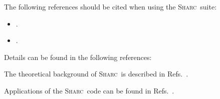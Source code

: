 \documentclass[a4paper,10pt,DIV=15,openany]{scrbook}
\newcommand{\sharc}{\textsc{Sharc}}
\begin{document}
The following references should be cited when using the \sharc\ suite:
{
\newcommand{\enquote}[1]{``#1''}
\begin{shaded}
  \begin{itemize}
    \item \cite{Mai2018WCMS} .
    \item \cite{Mai2019SHARC} .
  \end{itemize}
\end{shaded}
}

Details can be found in the following references:

The theoretical background of \sharc\ is described in Refs.~\cite{Richter2011JCTC, Richter2012JCTC_erratum, Bajo2012JPCA, Marquetand2011FD, Mai2015IJQC, Mai2018WCMS, Mai2018}.

Applications of the \sharc\ code can be found in Refs.~\cite{Richter2012JPCL, Mai2013C, Mai2014TCC, Mai2014JCP_SO2, Gonzalez2014, Richter2014PCCP,Martinez-Fernandez2014JCTC, Corrales2014PCCP, Crespo-Hernandez2015JACS, Marazzi2016JPCL, Richter2016JCTC, Cao2016CP, Banerjee2016PCCP, Mai2016JPCL, Mai2016NC, Peccati2016PTRSA, Murillo-Sanchez2017CPL, Borin2017PCCP, Mai2017CP, Siouri2017JPCA, Bellshaw2017CPL, Sun2017JPCA, Rauer2016JACS, Atkins2017JPCL, Schnappinger2017PCCP, Mai2017JCP, Zobel2018CEJ, Rauer2018MC, Cao2018JMS, Squibb2018NC}.
\end{document}
